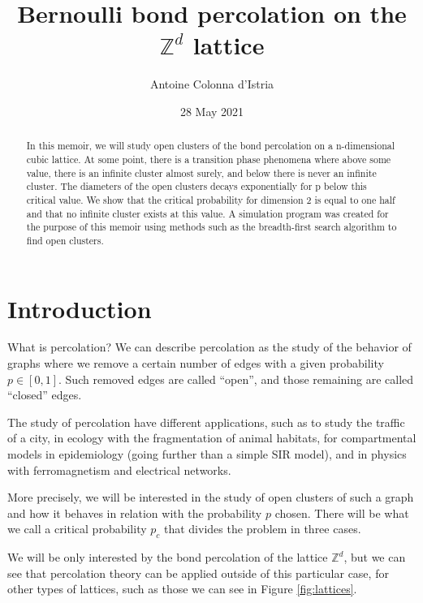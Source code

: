 \documentclass[a4paper,11pt]{article}
\title{Bernoulli bond percolation on the $\mathbb{Z}^d$ lattice}
\author{Antoine Colonna d'Istria}
\date{28 May 2021}
\theoremstyle{plain}
\theoremstyle{definition}
\theoremstyle{remark}
\begin{document}
\maketitle
\begin{abstract}
    In this memoir, we will study open clusters of the bond percolation on a n-dimensional cubic lattice. At some point, there is a transition phase phenomena where above some value, there is an infinite cluster almost surely, and below there is never an infinite cluster. The diameters of the open clusters decays exponentially for p below this critical value. We show that the critical probability for dimension 2 is equal to one half and that no infinite cluster exists at this value. A simulation program was created for the purpose of this memoir using methods such as the breadth-first search algorithm to find open clusters.
\end{abstract}

\tableofcontents
\newpage %

\section{Introduction}
What is percolation? We can describe percolation as the study of the behavior of graphs where we remove a certain number of edges with a given probability $p \in [0,1]$. Such removed edges are called ``open'', and those remaining are called ``closed'' edges.

The study of percolation have different applications, such as to study the traffic of a city, in ecology with the fragmentation of animal habitats, for compartmental models in epidemiology (going further than a simple SIR model), and in physics with ferromagnetism and electrical networks.

More precisely, we will be interested in the study of open clusters of such a graph and how it behaves in relation with the probability $p$ chosen. There will be what we call a critical probability $p_c$ that divides the problem in three cases.

We will be only interested by the bond percolation of the lattice $\mathbb{Z}^d$, but we can see that percolation theory can be applied outside of this particular case, for other types of lattices, such as those we can see in Figure \ref{fig:lattices}.
\end{document}
